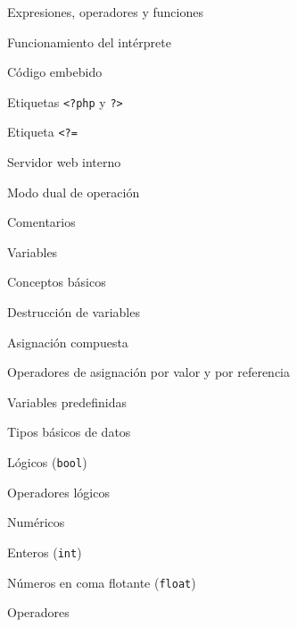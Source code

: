 \begin{longenum}
\begin{longenum}
\begin{longenum}
\begin{longenum}
            \end{longenum}
            \item Expresiones, operadores y funciones
        \end{longenum}
        \item Funcionamiento del intérprete
        \begin{longenum}
            \item Código embebido
            \begin{longenum}
                \item Etiquetas \texttt{<?php} y \texttt{?>}
                \item Etiqueta \texttt{<?=}
                \item Servidor web  interno
            \end{longenum}
            \item Modo dual de operación
            \item Comentarios
        \end{longenum}
        \item Variables
        \begin{longenum}
            \item Conceptos básicos
            \item Destrucción de variables
            \item Asignación compuesta
            \item Operadores de asignación por valor y por referencia
            \item Variables predefinidas
        \end{longenum}
        \item Tipos básicos de datos
        \begin{longenum}
            \item Lógicos (\texttt{bool})
            \begin{longenum}
                \item Operadores lógicos
            \end{longenum}
            \item Numéricos
            \begin{longenum}
                \item Enteros (\texttt{int})
                \item Números en coma flotante (\texttt{float})
                \item Operadores
                \begin{longenum}

\end{longenum}
\end{longenum}
\end{longenum}
\end{longenum}
\end{longenum}
